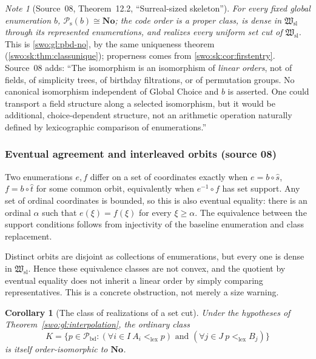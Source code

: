 \documentclass[11pt]{article}
\newtheorem{corollary}[corollary]{Corollary}
\theoremstyle{definition}
\theoremstyle{remark}
\newtheorem{note}[note]{Note}
\newcommand{\No}{\mathbf{No}}
\newcommand{\Hsl}{\mathfrak W_{\mathrm{sl}}}
\newcommand{\Pbd}{\mathcal P_{\mathrm{bd}}}
\newcommand{\Psupp}{\mathcal P_{\mathrm{s}}}
\newcommand{\lex}{\mathrm{lex}}
\begin{document}
\begin{note}[Source~08, Theorem~12.2, ``Surreal-sized skeleton'']\label{swo:sk:thm:skeleton}
\emph{For every fixed global enumeration $b$, $\Psupp(b)\cong\No$; the code
order is a proper class, is dense in $\Hsl$ through its represented
enumerations, and realizes every uniform set cut of $\Hsl$.} This is
\cref{swo:gl:pbd-no}, by the same uniqueness theorem
(\cref{swo:sk:thm:classunique}); properness comes from
\cref{swo:sk:cor:firstentry}. Source~08 adds: ``The isomorphism is an
isomorphism of \emph{linear orders}, not of fields, of simplicity trees, of
birthday filtrations, or of permutation groups. No canonical isomorphism
independent of Global Choice and $b$ is asserted. One could transport a field
structure along a selected isomorphism, but it would be additional,
choice-dependent structure, not an arithmetic operation naturally defined by
lexicographic comparison of enumerations.''
\end{note}

\subsubsection{Eventual agreement and interleaved orbits (source 08)}

Two enumerations $e,f$ differ on a set of coordinates exactly when
$e=b\circ\widehat s$, $f=b\circ\widehat t$ for some common orbit,
equivalently when $e^{-1}\circ f$ has set support. Any set of ordinal
coordinates is bounded, so this is also eventual equality: there is an
ordinal $\alpha$ such that $e(\xi)=f(\xi)$ for every $\xi\geq\alpha$.
The equivalence between the support conditions follows from
injectivity of the baseline enumeration and class replacement.

Distinct orbits are disjoint as collections of enumerations, but every
one is dense in $\Hsl$. Hence these equivalence classes are not convex,
and the quotient by eventual equality does not inherit a linear order
by simply comparing representatives. This is a concrete obstruction,
not merely a size warning.

\begin{corollary}[The class of realizations of a set cut]
\label{swo:gl:realizers}
Under the hypotheses of Theorem~\ref{swo:gl:interpolation}, the ordinary class
\[
 K=\{p\in\Pbd:(\forall i\in I\ A_i<_{\lex}p)
                    \text{ and }(\forall j\in J\ p<_{\lex}B_j)\}
\]
is itself order-isomorphic to $\No$.
\end{corollary}
\end{document}
